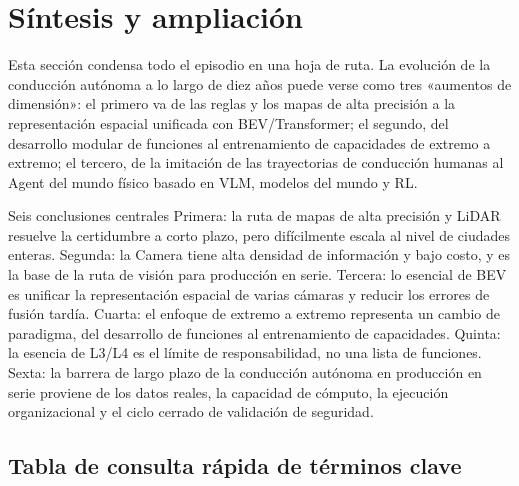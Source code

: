 \section{Síntesis y ampliación}

Esta sección condensa todo el episodio en una hoja de ruta. La evolución de la conducción autónoma a lo largo de diez años puede verse como tres «aumentos de dimensión»: el primero va de las reglas y los mapas de alta precisión a la representación espacial unificada con BEV/Transformer; el segundo, del desarrollo modular de funciones al entrenamiento de capacidades de extremo a extremo; el tercero, de la imitación de las trayectorias de conducción humanas al Agent del mundo físico basado en VLM, modelos del mundo y RL.

\begin{importantbox}{Seis conclusiones centrales}
Primera: la ruta de mapas de alta precisión y LiDAR resuelve la certidumbre a corto plazo, pero difícilmente escala al nivel de ciudades enteras. Segunda: la Camera tiene alta densidad de información y bajo costo, y es la base de la ruta de visión para producción en serie. Tercera: lo esencial de BEV es unificar la representación espacial de varias cámaras y reducir los errores de fusión tardía. Cuarta: el enfoque de extremo a extremo representa un cambio de paradigma, del desarrollo de funciones al entrenamiento de capacidades. Quinta: la esencia de L3/L4 es el límite de responsabilidad, no una lista de funciones. Sexta: la barrera de largo plazo de la conducción autónoma en producción en serie proviene de los datos reales, la capacidad de cómputo, la ejecución organizacional y el ciclo cerrado de validación de seguridad.
\end{importantbox}

\subsection{Tabla de consulta rápida de términos clave}

